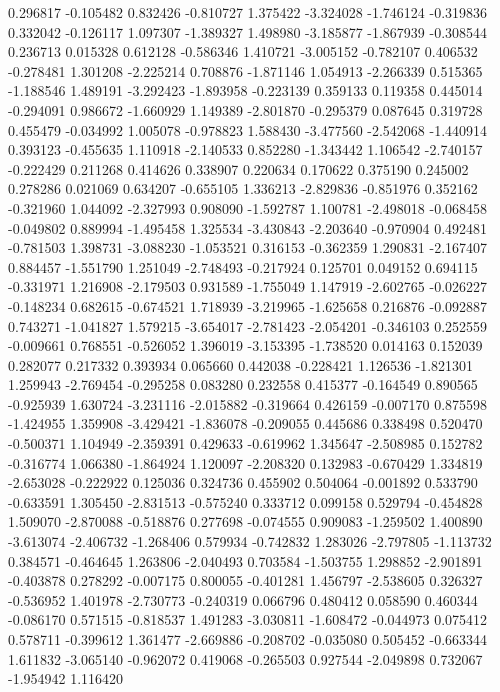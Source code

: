 0.296817
-0.105482
0.832426
-0.810727
1.375422
-3.324028
-1.746124
-0.319836
0.332042
-0.126117
1.097307
-1.389327
1.498980
-3.185877
-1.867939
-0.308544
0.236713
0.015328
0.612128
-0.586346
1.410721
-3.005152
-0.782107
0.406532
-0.278481
1.301208
-2.225214
0.708876
-1.871146
1.054913
-2.266339
0.515365
-1.188546
1.489191
-3.292423
-1.893958
-0.223139
0.359133
0.119358
0.445014
-0.294091
0.986672
-1.660929
1.149389
-2.801870
-0.295379
0.087645
0.319728
0.455479
-0.034992
1.005078
-0.978823
1.588430
-3.477560
-2.542068
-1.440914
0.393123
-0.455635
1.110918
-2.140533
0.852280
-1.343442
1.106542
-2.740157
-0.222429
0.211268
0.414626
0.338907
0.220634
0.170622
0.375190
0.245002
0.278286
0.021069
0.634207
-0.655105
1.336213
-2.829836
-0.851976
0.352162
-0.321960
1.044092
-2.327993
0.908090
-1.592787
1.100781
-2.498018
-0.068458
-0.049802
0.889994
-1.495458
1.325534
-3.430843
-2.203640
-0.970904
0.492481
-0.781503
1.398731
-3.088230
-1.053521
0.316153
-0.362359
1.290831
-2.167407
0.884457
-1.551790
1.251049
-2.748493
-0.217924
0.125701
0.049152
0.694115
-0.331971
1.216908
-2.179503
0.931589
-1.755049
1.147919
-2.602765
-0.026227
-0.148234
0.682615
-0.674521
1.718939
-3.219965
-1.625658
0.216876
-0.092887
0.743271
-1.041827
1.579215
-3.654017
-2.781423
-2.054201
-0.346103
0.252559
-0.009661
0.768551
-0.526052
1.396019
-3.153395
-1.738520
0.014163
0.152039
0.282077
0.217332
0.393934
0.065660
0.442038
-0.228421
1.126536
-1.821301
1.259943
-2.769454
-0.295258
0.083280
0.232558
0.415377
-0.164549
0.890565
-0.925939
1.630724
-3.231116
-2.015882
-0.319664
0.426159
-0.007170
0.875598
-1.424955
1.359908
-3.429421
-1.836078
-0.209055
0.445686
0.338498
0.520470
-0.500371
1.104949
-2.359391
0.429633
-0.619962
1.345647
-2.508985
0.152782
-0.316774
1.066380
-1.864924
1.120097
-2.208320
0.132983
-0.670429
1.334819
-2.653028
-0.222922
0.125036
0.324736
0.455902
0.504064
-0.001892
0.533790
-0.633591
1.305450
-2.831513
-0.575240
0.333712
0.099158
0.529794
-0.454828
1.509070
-2.870088
-0.518876
0.277698
-0.074555
0.909083
-1.259502
1.400890
-3.613074
-2.406732
-1.268406
0.579934
-0.742832
1.283026
-2.797805
-1.113732
0.384571
-0.464645
1.263806
-2.040493
0.703584
-1.503755
1.298852
-2.901891
-0.403878
0.278292
-0.007175
0.800055
-0.401281
1.456797
-2.538605
0.326327
-0.536952
1.401978
-2.730773
-0.240319
0.066796
0.480412
0.058590
0.460344
-0.086170
0.571515
-0.818537
1.491283
-3.030811
-1.608472
-0.044973
0.075412
0.578711
-0.399612
1.361477
-2.669886
-0.208702
-0.035080
0.505452
-0.663344
1.611832
-3.065140
-0.962072
0.419068
-0.265503
0.927544
-2.049898
0.732067
-1.954942
1.116420
